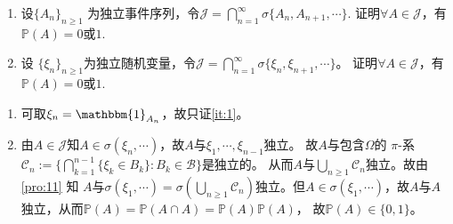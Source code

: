 \documentclass{ctexart}
\begin{document}
\begin{problem}\label{pro:12}
  \begin{enumerate}
    \item 设\(\{A_n\}_{n \geq 1} \) 为独立事件序列，令\(\mathcal{J} = \bigcap_{n=1}^{\infty} \sigma\{A_n,A_{n + 1},\cdots\}. \)
      证明\(\forall A \in \mathcal{J} \)，有\(\mathbb{P} (A) =0 \)或\(1 \).
    \item 设 \(\{\xi_n\}_{n \geq 1} \)为独立随机变量，令\(\mathcal{J} = \bigcap_{n=1}^{\infty} \sigma\{\xi_n,\xi_{n + 1},\cdots\} \)。
      证明\(\forall A \in \mathcal{J} \)，有\(\mathbb{P}(A)=0 \)或\(1 \).
  \end{enumerate}
\end{problem}
\begin{solution}
  \begin{enumerate}
    \item 可取\(\xi_n=\mathbbm{1}_{A_n} \)，故只证\ref{it:1}。
    \item \label{it:1} 由\(A \in \mathcal{J} \)知\(A \in \sigma(\xi_n,\cdots) \)，故\(A \)与\(\xi_1,\cdots,\xi_{n-1}  \)独立。
      故\(A \)与包含\(\Omega \)的 \(\pi \)-系\(\mathcal{C}_n:=\{ \bigcap_{k=1}^{n-1} \{\xi_k\in B_k\} :B_k \in \mathcal{B} \} \)是独立的。
      从而\(A \)与\(\bigcup_{n \geq 1}\mathcal{C}_n \)独立。故由\ref{pro:11} 知
      \(A \)与\(\sigma(\xi_1,\cdots)=\sigma(\bigcup_{n \geq 1}\mathcal{C}_n) \)独立。但\(A \in \sigma(\xi_1,\cdots) \)，故\(A \)与\(A \)独立，从而\(\mathbb{P}(A)=\mathbb{P}(A \cap A)=\mathbb{P}(A)\mathbb{P}(A) \)，
      故\(\mathbb{P}(A) \in \{0,1\} \)。
  \end{enumerate}

\end{solution}
\end{document}
